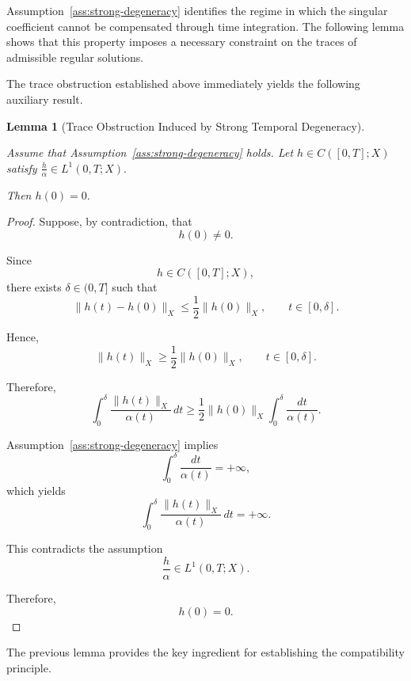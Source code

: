 \documentclass[pdflatex,sn-mathphys-num]{sn-jnl}
\theoremstyle{thmstyleone}%
\theoremstyle{thmstyletwo}%
\theoremstyle{thmstylethree}%
\newtheorem{lemma}{Lemma}
\begin{document}
Assumption~\ref{ass:strong-degeneracy} identifies the regime in which the singular coefficient cannot be compensated through time integration.
The following lemma shows that this property imposes a necessary constraint on the traces of admissible regular solutions.

The trace obstruction established above immediately yields the following auxiliary result.

\begin{lemma}[Trace Obstruction Induced by Strong Temporal Degeneracy]
\label{lem:trace-obstruction}

Assume that
Assumption~\ref{ass:strong-degeneracy}
holds.
Let
\(
h\in C([0,T];X)
\)
satisfy
\(
\frac{h}{\alpha}
\in
L^{1}(0,T;X).
\)

Then
\(
h(0)=0.
\)

\end{lemma}

\begin{proof}

Suppose, by contradiction, that
\[
h(0)\neq0.
\]

Since
\[
h\in C([0,T];X),
\]
there exists
\(
\delta\in(0,T]
\)
such that
\[
\|h(t)-h(0)\|_X
\le
\frac12\|h(0)\|_X,
\qquad
t\in[0,\delta].
\]

Hence,
\[
\|h(t)\|_X
\ge
\frac12\|h(0)\|_X,
\qquad
t\in[0,\delta].
\]

Therefore,
\[
\int_{0}^{\delta}
\frac{\|h(t)\|_X}{\alpha(t)}
\,dt
\ge
\frac12
\|h(0)\|_X
\int_{0}^{\delta}
\frac{dt}{\alpha(t)}.
\]

Assumption~\ref{ass:strong-degeneracy} implies
\[
\int_{0}^{\delta}
\frac{dt}{\alpha(t)}
=
+\infty,
\]
which yields
\[
\int_{0}^{\delta}
\frac{\|h(t)\|_X}{\alpha(t)}
\,dt
=
+\infty.
\]

This contradicts the assumption
\[
\frac{h}{\alpha}
\in
L^{1}(0,T;X).
\]

Therefore,
\[
h(0)=0.
\]

\end{proof}

The previous lemma provides the key ingredient for establishing the compatibility principle.
\end{document}
